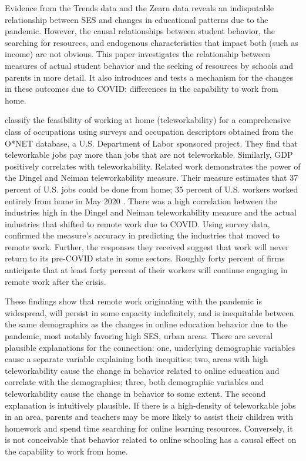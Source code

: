 Evidence from the Trends data and the Zearn data reveals an indisputable relationship between SES and changes in educational patterns due to the pandemic.
However, the causal relationships between student behavior, the searching for resources, and endogenous characteristics that impact both (such as income) are not obvious.
This paper investigates the relationship between measures of actual student behavior and the seeking of resources by schools and parents in more detail.
It also introduces and tests a mechanism for the changes in these outcomes due to COVID: differences in the capability to work from home.

\cite{dingel} classify the feasibility of working at home (teleworkability) for a comprehensive class of occupations using surveys and occupation descriptors obtained from the O*NET database, a U.S. Department of Labor sponsored project.
They find that teleworkable jobs pay more than jobs that are not teleworkable.
Similarly, GDP positively correlates with teleworkability.
Related work demonstrates the power of the Dingel and Neiman teleworkability measure.
Their measure estimates that 37 percent of U.S. jobs could be done from home; 35 percent of U.S. workers worked entirely from home in May 2020 \citep{blandin}.
There was a high correlation between the industries high in the Dingel and Neiman teleworkability measure and the actual industries that shifted to remote work due to COVID.
Using survey data, \cite{bartik} confirmed the measure’s accuracy in predicting the industries that moved to remote work.
Further, the responses they received suggest that work will never return to its pre-COVID state in some sectors.
Roughly forty percent of firms anticipate that at least forty percent of their workers will continue engaging in remote work after the crisis.

These findings show that remote work originating with the pandemic is widespread, will persist in some capacity indefinitely, and is inequitable between the same demographics as the changes in online education behavior due to the pandemic, most notably favoring high SES, urban areas.
There are several plausible explanations for the connection: one, underlying demographic variables cause a separate variable explaining both inequities; two, areas with high teleworkability cause the change in behavior related to online education and correlate with the demographics; three, both demographic variables and teleworkability cause the change in behavior to some extent.
The second explanation is intuitively plausible.
If there is a high-density of teleworkable jobs in an area, parents and teachers may be more likely to assist their children with homework and spend time searching for online learning resources.
Conversely, it is not conceivable that behavior related to online schooling has a causal effect on the capability to work from home.

